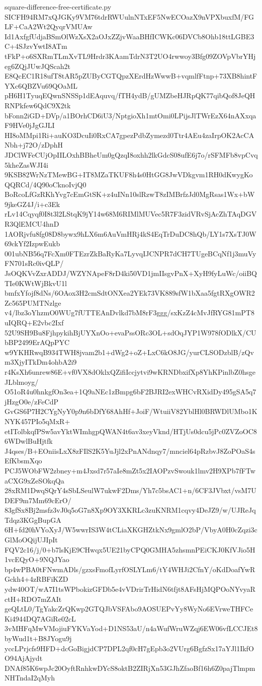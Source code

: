 \documentclass[11pt]{article}
\theoremstyle{definition}
\theoremstyle{remark}
\begin{document}
\begin{filecontents*}[overwrite]{square-difference-free-certificate.py}
SICFH94RM7xQJGKy9VM76tdrRWUulnNTxEF5NwECOazX9nVPXbuxfM/FGLF+CaA2Wt2QyqrVMUAw
Id1AxfgfUdjaBSmOlWzXsX2aOJxZZjvWaaBHfICWKc06DVCb8Ohb18ttLGBE3C+4SJzvYwtI8ATm
tFkP+o6SXRmTLmXvTL9Hrdr3KAamTdrN3T2UO4rwwoy3Bfg09ZOVpVbrYHjeg6ZQjJUwJQScah2t
E8QcEC1R18ufT8tAR5pZUByCGTQpzXErdHzWwwB+vqmlfFtnp+73XB8hintFYXc6QBZVu69QOaML
pH6H1TyuqEQwnSNSSp1dEAquvq/fTH4ydB/gUMZbeHJRpQK77qibQof8JeQHRNPkfew6QdC9X2tk
bFonn2iGD+DVp/a1BOrhCD6iU3/NptgioXh1mtOmi0LPijsJlTWrEzX64nAXxqaF9HVe0jJgGJLI
HI8oMMpi1Ri+auKO3DcuIi0RxCA7gpezPdbZymezd0Ttr4AEu4zaIrpOK2AcCANbh+j72O/zDphH
JDClWFeCUjOpIILOxhBBheUm0gQzqI8oxhh2lkGdcS08ufE6j7o/rSFMFb8vpCvq5kheZasWJI4i
9KSB82WrNzTMewBG+IT8MZaTKUF8h4s0HtGG8JwVDkgvm1RH0dKwygKoQQRCd/4Q90oCknoIvjQ0
BoRcoLfGzRKhYvg7cEmGtSK+z4uINn10slRzwT8zIMBrfzJd0MgRsas1Wx+bW9jkeGZ4J/i+c3Ek
rLv14Cqyqf0I8t3l2LStqK9jY14w68M6RIMlMUVec5R7F3zidVRvSjAcZhTAqDGVR3QlEMCU4hnD
1AORjvfu8fg08D8bywx9hLX6m6AuVmHRj4kS4EqTrDuDC8hQb/LY1s7XsTJ0W69ckYf2IzpwEukb
001ubNB56q7FcXm0FTEzrZkBaRyKa7LyvqIJCNPR7dCH7TUgeBCqNf1j3muVyFN701sRc0ivQLP/
JsOQKVvZxrADDJ/WZYNApeF8rD4ki50VD1jmIIsgvPnX+XyH9fyLuWc/oiiBQTIe0KWtWjBkvU1l
bmfxYfojf8dNs/6OAox3H2cmSdtONXea2YEk73VK889sfW1bXaa5fgtRXgOWR2Zc565PUMTNzlge
v4/lbz3oYhzmO0WUg7fUTTEAnDvlkd7bM8rF3ggg/sxKzZ4cMvJfRYG81mPT8uIQRQ+E2vbc2Ixf
52U9SH9Bu8FjhpykihBjUYXnOo+evaPssORc3OL+sdOqJYP1W978fODlkX/CUbBP2499ErAQpPYC
w9YKHRwqB934TWH8jvam2b1+dWg2+oZ+LxC6kO8JG/yurCLSODzblB/zQvm3XjyITkDm4ohbA2i9
r4KsXh6unrew86E+vf0VX8dOklxQZifiIccjytvi9wKRNDbxifXp8YhKPinlbZ0hsgeJLblmoyg/
O51oR4u0hnkgfOn3ea+1Q9aNEc1zBmpg6bF2BJRI2exWHCvRXidDy495gSA5q7jHzgO0e/zFeCdP
GvGS6P7H2CYgNyY0p9n6bDfY68AhHf+JoiF/WtuiiV82YblHl0BRWDlUMbo1KNYK457PIo5qMxR+
etITolbkqfPSw5avYktWImhgpQWAN4t6av3xeyVknd/HTjUs0dcu5jPc0ZVZoOC86WDwlBuHjtfk
J4qses/B+EOniisLxX8zFIlS2K5YuJjl2xPnANdnqy7/mnciel64pRzbvJ8ZoPOaS4sEfKbsmXqo
PCJ5WObFW2zbney+m4Jxsd7r57aIe8mZt5x2IAOPzvSwouk1lmv2H9XPb7fFTwaCXG9xZeSOkqQa
28xRM1DwqSQrY4sSbLSeulW7ukwF2Dms/Yh7c5bsAC1+n/6CF3JVbxt/vsM7UDEF9m7Mm69cErO/
83gfSx8Bj2msfz3vJ0q5oG7n8Xp9OY3XKRLc3zuKNRM1cqvy4DeJZ9/w/UJReJqTdqz3KGgBupGA
6H+fd20hVYoXyJ/W5wwrIS3W4tCLiaXKGHZtkNx9gmlO2bP/VbyA0H0cZqzi3cGlMoOQijUJIpIt
FQV2c16/j/0+b7lsKjE9CHwqx5UE21byCPQ0GMHA5zhsmnPEiCKJ0KfVJio5H1vcEQyO+9NQJYao
bp4wPBA0tFNwmADls/gzxsFmofLyrfOSLYLm6/tY4WHJi2CfnY/oKdDoafYwRGckh4+4zRBFiKZD
ydw40OT/wA7I1tsWPbokizGFDb5e4vVDrirTrHidN6tfjt8AFsHjMQPOoNYvyaRctH+RDO7mZAIt
geQLtL0/TgYakcZrQKwp2GTQJbVSFAbo9AOSUEPvYy8WyNo6EVrweTHFCeKi4944DQ7AGiRe02cL
3vMHFqMwVMojiuFYKVaYod+D1NS53aU/n4aWufWruWZqj6EW06vfLCCJEt8byWud1t+B8JYogu9j
yccLPrjcfs9HFD+dcGoBigjdCP7DPL2qf0cH7gEpb3o2VUrg6BgfzSx17aYJl1IkfOO94AjAjydt
DNAf85K6wpJc20OyftRnhkwDYcS8oktB2ZIRjXn53GJhZfaoBf16h6Z0pajTlmpmNHTndaI2qMyh

\end{filecontents*}
\end{document}
